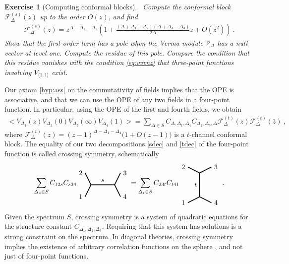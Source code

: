 \documentclass[12pt, a4paper]{article}
\theoremstyle{break}
\newtheorem{exo}{Exercise}[section]
\begin{document}
\begin{exo}[Computing conformal blocks]
 ~\label{exo:block}
 Compute the conformal block $ \mathcal{F}^{(s)}_\Delta(z)$ up to the order $O(z)$, and find
 \begin{align}
  \mathcal{F}^{(s)}_\Delta(z) = z^{\Delta-\Delta_1-\Delta_2}\left( 1 + \frac{(\Delta+\Delta_1-\Delta_2)(\Delta+\Delta_4-\Delta_3)}{2\Delta}z + O(z^2) \right)\ .
  \label{eq:fsl}
 \end{align}
 Show that the first-order term has a pole when the Verma module $\mathcal{V}_\Delta$ has a null vector at level one.
 Compute the residue of this pole. Compare the condition that this residue vanishes with the condition \eqref{eq:vvvnz} that three-point functions involving $V_{\langle 1,1\rangle}$ exist.
\end{exo}

Our axiom \ref{hyp:ass} on the commutativity of fields implies that the OPE is associative, and that we can use the OPE of any two fields in a four-point function. In particular, using the OPE of the first and fourth fields, we obtain 
\begin{align}
 \Big<V_{\Delta_1}(z)V_{\Delta_2}(0)V_{\Delta_3}(\infty)V_{\Delta_4}(1)\Big>
 =\sum_{\Delta\in S} C_{\Delta,\Delta_1,\Delta_4} C_{\Delta_2,\Delta_3,\Delta}   \mathcal{F}^{(t)}_\Delta(z) \mathcal{F}^{(t)}_\Delta(\bar z)\ ,
 \label{tdec}
\end{align}
where $\mathcal{F}^{(t)}_\Delta(z) = (z-1)^{\Delta-\Delta_1-\Delta_4}\Big(1+O(z-1)\Big)$ is a $t$-channel conformal block.
The equality of our two decompositions \eqref{sdec} and \eqref{tdec} of the four-point function is called crossing symmetry, schematically 
\begin{align}
 \sum_{\Delta_s\in S} C_{12s} C_{s34} 
 \begin{tikzpicture}[baseline=(current  bounding  box.center), very thick, scale = .3]
\draw (-1,2) node [left] {$2$} -- (0,0) -- node [above] {$s$} (4,0) -- (5,2) node [right] {$3$};
\draw (-1,-2) node [left] {$1$} -- (0,0);
\draw (4,0) -- (5,-2) node [right] {$4$};
\end{tikzpicture} 
= \sum_{\Delta_t\in S} C_{23t}C_{t41} 
\begin{tikzpicture}[baseline=(current  bounding  box.center), very thick, scale = .3]
 \draw (-2,3) node [left] {$2$} -- (0,2) -- node [left] {$t$} (0,-2) -- (-2, -3) node [left] {$1$};
\draw (0,2) -- (2,3) node [right] {$3$};
\draw (0,-2) -- (2, -3) node [right] {$4$};
\end{tikzpicture}
\ .
\label{csd}
\end{align}
Given the spectrum $S$, crossing symmetry is a system of quadratic equations for the structure constant $C_{\Delta_1,\Delta_2,\Delta_3}$. Requiring that this system has solutions is a strong constraint on the spectrum. 
In diagonal theories, crossing symmetry implies the existence of arbitrary correlation functions on the sphere \cite{ms89b}, and not just of four-point functions.
\end{document}
